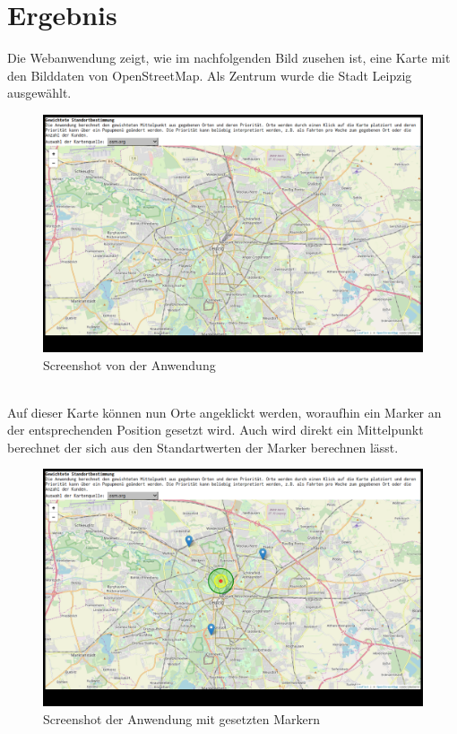 \documentclass[a4paper, 12pt]{scrreprt}
\begin{document}
\chapter{Ergebnis}
Die Webanwendung zeigt, wie im nachfolgenden Bild zusehen ist, eine Karte mit den Bilddaten von OpenStreetMap. Als Zentrum wurde die Stadt Leipzig ausgewählt.\\
\begin{figure}[h]
\includegraphics[width=\linewidth]{bell1_1.png}
\caption{Screenshot von der Anwendung}
\end{figure}\\
Auf dieser Karte können nun Orte angeklickt werden, woraufhin ein Marker an der entsprechenden Position gesetzt wird. Auch wird direkt ein Mittelpunkt berechnet der sich aus den Standartwerten der Marker berechnen lässt.\\
\begin{figure}[h]
\includegraphics[width=\linewidth]{bell2_1.png}
\caption{Screenshot der Anwendung mit gesetzten Markern}
\end{figure}
\end{document}
